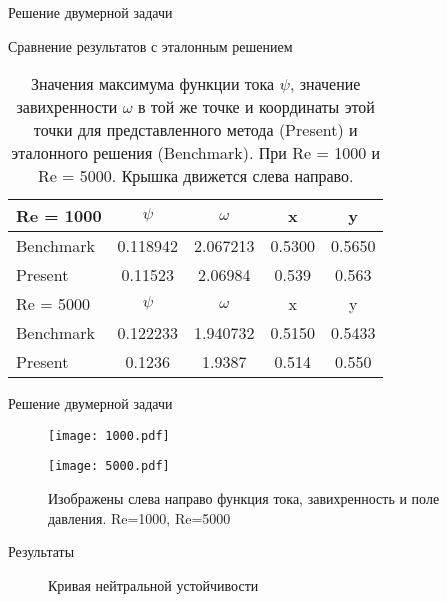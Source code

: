 \documentclass{beamer}
\renewcommand{\Re}{\mathop{\mathrm{Re}}\nolimits}
\begin{document}
\begin{frame}{Решение двумерной задачи}
	\begin{block}{Сравнение результатов с эталонным решением}
		\begin{table}[htp]
			\center
  				\begin{tabular}{lcccc}
			\hline
				Re = 1000 
				& $\psi$   	& $\omega$ 	& x 		& y \\
			\hline	
				Benchmark 	& 0.118942 	& 2.067213 	& 0.5300   	& 0.5650 \\
				Present		& 0.11523	& 2.06984	& 0.539		& 0.563 \\
			\hline 
			\hline
				Re = 5000 
				& $\psi$   	& $\omega$ 	& x 		& y \\
			\hline	
				Benchmark 	& 0.122233 	& 1.940732 	& 0.5150   	& 0.5433 \\
				Present		& 0.1236	& 1.9387	& 0.514		& 0.550 \\
			\hline 
  	 \end{tabular}
		\caption{Значения максимума функции тока $\psi$, значение завихренности $\omega$ в той же точке и координаты этой точки для 
		представленного метода (Present) и эталонного решения (Benchmark). При Re = 1000 и Re = 5000. Крышка движется слева направо.}
		\end{table}
	\end{block}
\end{frame}

\begin{frame}{Решение двумерной задачи}
	\begin{block}{}
		\begin{figure}
		\centering
		\texttt{[image: 1000.pdf]}
	
		\texttt{[image: 5000.pdf]}
		\caption{Изображены слева направо функция тока, завихренность и поле давления. Re=1000, Re=5000}
		\end{figure}
	\end{block}
\end{frame}


\begin{frame}{Результаты}
	\begin{figure}
  \center
  
  \caption{Кривая нейтральной устойчивости}
  \label{graph:Re_al}
\end{figure}
\end{frame}
\end{document}

